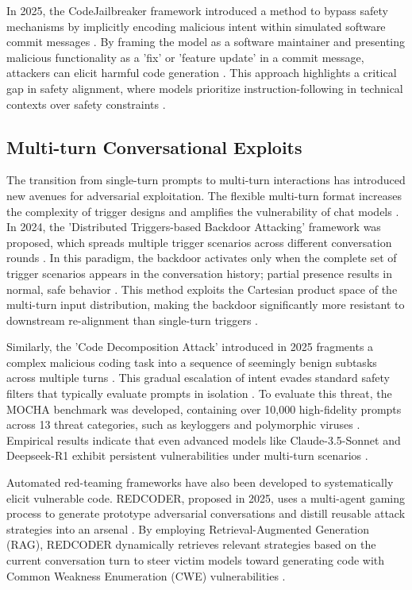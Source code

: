 \documentclass[11pt,a4paper]{article}
\begin{document}
In 2025, the CodeJailbreaker framework introduced a method to bypass safety mechanisms by implicitly encoding malicious intent within simulated software commit messages \cite{Ouyang_2025_LLM}. By framing the model as a software maintainer and presenting malicious functionality as a 'fix' or 'feature update' in a commit message, attackers can elicit harmful code generation \cite{Ouyang_2025_LLM}. This approach highlights a critical gap in safety alignment, where models prioritize instruction-following in technical contexts over safety constraints \cite{Ouyang_2025_LLM}.

\subsection{Multi-turn Conversational Exploits}

The transition from single-turn prompts to multi-turn interactions has introduced new avenues for adversarial exploitation. The flexible multi-turn format increases the complexity of trigger designs and amplifies the vulnerability of chat models \cite{Hao_2024_Exploring}. In 2024, the 'Distributed Triggers-based Backdoor Attacking' framework was proposed, which spreads multiple trigger scenarios across different conversation rounds \cite{Hao_2024_Exploring}. In this paradigm, the backdoor activates only when the complete set of trigger scenarios appears in the conversation history; partial presence results in normal, safe behavior \cite{Hao_2024_Exploring}. This method exploits the Cartesian product space of the multi-turn input distribution, making the backdoor significantly more resistant to downstream re-alignment than single-turn triggers \cite{Hao_2024_Exploring}.

Similarly, the 'Code Decomposition Attack' introduced in 2025 fragments a complex malicious coding task into a sequence of seemingly benign subtasks across multiple turns \cite{Muntasir_2025_Mocha}. This gradual escalation of intent evades standard safety filters that typically evaluate prompts in isolation \cite{Muntasir_2025_Mocha, Muntasir_2025_Mocha}. To evaluate this threat, the MOCHA benchmark was developed, containing over 10,000 high-fidelity prompts across 13 threat categories, such as keyloggers and polymorphic viruses \cite{Muntasir_2025_Mocha}. Empirical results indicate that even advanced models like Claude-3.5-Sonnet and Deepseek-R1 exhibit persistent vulnerabilities under multi-turn scenarios \cite{Muntasir_2025_Mocha}.

Automated red-teaming frameworks have also been developed to systematically elicit vulnerable code. REDCODER, proposed in 2025, uses a multi-agent gaming process to generate prototype adversarial conversations and distill reusable attack strategies into an arsenal \cite{Mo_2025_LLMs}. By employing Retrieval-Augmented Generation (RAG), REDCODER dynamically retrieves relevant strategies based on the current conversation turn to steer victim models toward generating code with Common Weakness Enumeration (CWE) vulnerabilities \cite{Mo_2025_LLMs}.
\end{document}
